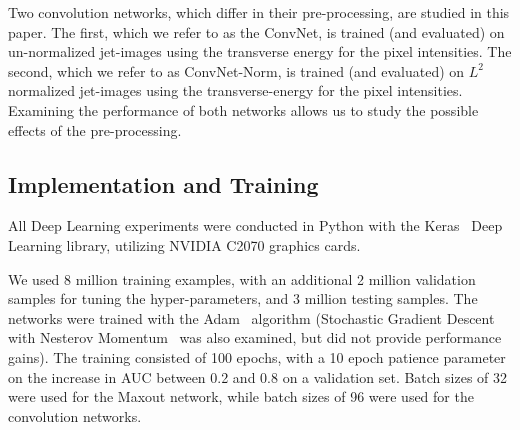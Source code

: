 Two convolution networks, which differ in their pre-processing, are studied in this paper.  The first, which we refer to as the ConvNet, is trained (and evaluated) on un-normalized jet-images using the transverse energy for the pixel intensities.  The second, which we refer to as ConvNet-Norm, is trained (and evaluated) on $L^{2}$ normalized jet-images using the transverse-energy for the pixel intensities.  Examining the performance of both networks allows us to study the possible effects of the pre-processing.




\subsection{Implementation and Training} %
\label{ssub:implementation_and_training}

All Deep Learning experiments were conducted in Python with the Keras~\cite{Keras} Deep Learning library, utilizing NVIDIA C2070 graphics cards.

We used 8 million training examples, with an additional 2 million validation samples for tuning the hyper-parameters, and 3 million testing samples.  The networks were trained with the Adam~\cite{DBLP:journals/corr/KingmaB14} algorithm (Stochastic Gradient Descent with Nesterov Momentum~\cite{Nesterov:1983wy} was also examined, but did not provide performance gains).  The training consisted of 100 epochs, with a 10 epoch patience parameter on the increase in AUC between 0.2 and 0.8 on a validation set.  Batch sizes of 32 were used for the Maxout network, while batch sizes of 96 were used for the convolution networks.


